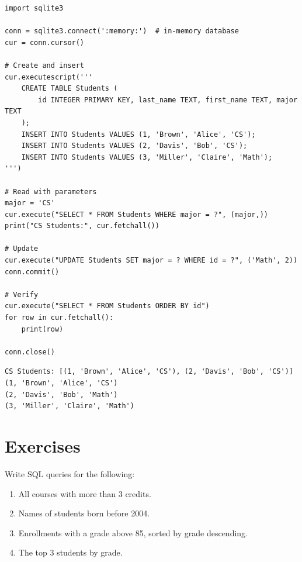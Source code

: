 \begin{codeblock}[title=\textbf{Complete CRUD with Python/sqlite3}]
\begin{verbatim}
import sqlite3

conn = sqlite3.connect(':memory:')  # in-memory database
cur = conn.cursor()

# Create and insert
cur.executescript('''
    CREATE TABLE Students (
        id INTEGER PRIMARY KEY, last_name TEXT, first_name TEXT, major TEXT
    );
    INSERT INTO Students VALUES (1, 'Brown', 'Alice', 'CS');
    INSERT INTO Students VALUES (2, 'Davis', 'Bob', 'CS');
    INSERT INTO Students VALUES (3, 'Miller', 'Claire', 'Math');
''')

# Read with parameters
major = 'CS'
cur.execute("SELECT * FROM Students WHERE major = ?", (major,))
print("CS Students:", cur.fetchall())

# Update
cur.execute("UPDATE Students SET major = ? WHERE id = ?", ('Math', 2))
conn.commit()

# Verify
cur.execute("SELECT * FROM Students ORDER BY id")
for row in cur.fetchall():
    print(row)

conn.close()
\end{verbatim}
\end{codeblock}

\begin{codeoutput}
\begin{verbatim}
CS Students: [(1, 'Brown', 'Alice', 'CS'), (2, 'Davis', 'Bob', 'CS')]
(1, 'Brown', 'Alice', 'CS')
(2, 'Davis', 'Bob', 'Math')
(3, 'Miller', 'Claire', 'Math')
\end{verbatim}
\end{codeoutput}

\section*{Exercises}

\begin{exercise}
Write SQL queries for the following:
\begin{enumerate}
    \item All courses with more than 3 credits.
    \item Names of students born before 2004.
    \item Enrollments with a grade above 85, sorted by grade descending.
    \item The top 3 students by grade.
\end{enumerate}
\end{exercise}

